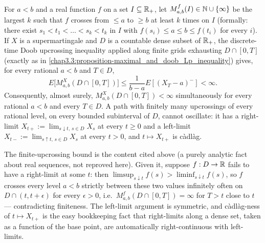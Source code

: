 \begin{proposition} \label{chap3.3:proposition-upcrossing_and_onesided_limits}  \\
For $a<b$ and a real function $f$ on a set $I\subseteq\mathbb{R}_+$, let $M_{a,b}^f(I)\in\mathbb{N}\cup\{\infty\}$ be the largest $k$ such that $f$ crosses from $\le a$ to $\ge b$ at least $k$ times on $I$ (formally: there exist $s_1<t_1<\dots<s_k<t_k$ in $I$ with $f(s_i)\le a\le b\le f(t_i)$ for every $i$). If $X$ is a supermartingale and $D$ is a countable dense subset of $\mathbb{R}_+$, the discrete-time Doob upcrossing inequality applied along finite grids exhausting $D\cap[0,T]$ (exactly as in \cref{chap3.3:proposition-maximal_and_doob_Lp_inequality}) gives, for every rational $a<b$ and $T\in D$,
$$E\big[M_{a,b}^X(D\cap[0,T])\big]\le\frac{1}{b-a}E[(X_T-a)^-]<\infty.$$
Consequently, almost surely, $M_{a,b}^X(D\cap[0,T])<\infty$ simultaneously for every rational $a<b$ and every $T\in D$. A path with finitely many upcrossings of every rational level, on every bounded subinterval of $D$, cannot oscillate: it has a right-limit $X_{t+}:=\lim_{s\downarrow t,\,s\in D}X_s$ at every $t\ge0$ and a left-limit $X_{t-}:=\lim_{s\uparrow t,\,s\in D}X_s$ at every $t>0$, and $t\mapsto X_{t+}$ is càdlàg.
\end{proposition}
\begin{proofidea}
The finite-upcrossing bound is the content cited above (a purely analytic fact about real sequences, not reproved here). Given it, suppose $f:D\to\mathbb{R}$ fails to have a right-limit at some $t$: then $\limsup_{s\downarrow t}f(s)>\liminf_{s\downarrow t}f(s)$, so $f$ crosses every level $a<b$ strictly between these two values infinitely often on $D\cap(t,t+\epsilon)$ for every $\epsilon>0$, i.e.\ $M_{a,b}^f(D\cap[0,T])=\infty$ for $T>t$ close to $t$ --- contradicting finiteness. The left-limit argument is symmetric, and càdlàg-ness of $t\mapsto X_{t+}$ is the easy bookkeeping fact that right-limits along a dense set, taken as a function of the base point, are automatically right-continuous with left-limits.
\end{proofidea}

